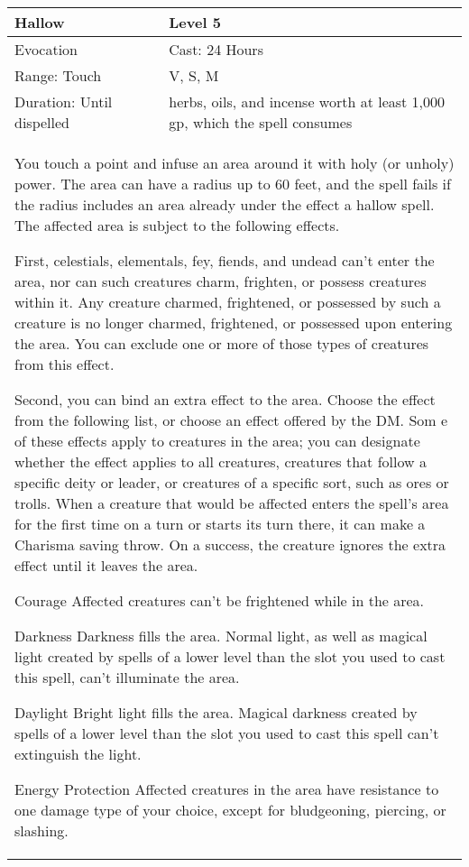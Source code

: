 \documentclass[11pt]{report}
\begin{document}
\begin{table}[H]
	\begin{tabular}{||p{6cm}|p{6cm}||}
		\hline\hline
		\bf{Hallow} & Level 5\\ \hline
		Evocation & Cast: 24 Hours\\ \hline
		Range: Touch & V, S, M\\ \hline
		Duration: Until dispelled & herbs, oils, and incense worth at least 1,000 gp, which the spell consumes\\ \hline
		\multicolumn{2}{||p{12cm}||}{You touch a point and infuse an area around it with holy (or unholy) power. The area can have a radius up to 60 feet, and the spell fails if the radius includes an area already under the effect a hallow spell. The affected area is subject to the following effects.

First, celestials, elementals, fey, fiends, and undead can’t enter the area, nor can such creatures charm, frighten, or possess creatures within it. Any creature charmed, frightened, or possessed by such a creature is no longer charmed, frightened, or possessed upon entering the area. You can exclude one or more of those types of creatures from this effect.

Second, you can bind an extra effect to the area. Choose the effect from the following list, or choose an effect offered by the DM. Som e of these effects apply to creatures in the area; you can designate whether the effect applies to all creatures, creatures that follow a specific deity or leader, or creatures of a specific sort, such as ores or trolls. When a creature that would be affected enters the spell’s area for the first time on a turn or starts its turn there, it can make a Charisma saving throw. On a success, the creature ignores the extra effect until it leaves the area.

Courage
Affected creatures can’t be frightened while in the area. 

Darkness
Darkness fills the area. Normal light, as well as magical light created by spells of a lower level than the slot you used to cast this spell, can’t illuminate the area.

Daylight
Bright light fills the area. Magical darkness created by spells of a lower level than the slot you used to cast this spell can’t extinguish the light.

Energy Protection
Affected creatures in the area have resistance to one damage type of your choice, except for bludgeoning, piercing, or slashing.

}
\end{tabular}
\end{table}
\end{document}
